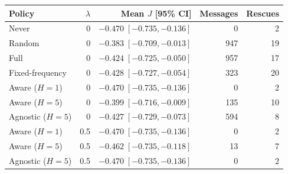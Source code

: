 \begin{tabular}{@{}lrrrr@{}}
\toprule
Policy & $\lambda$ & Mean $J$ [95\% CI] & Messages & Rescues \\
\midrule
Never & 0 & $-0.470\; [-0.735, -0.136]$ & 0 & 2 \\
Random & 0 & $-0.383\; [-0.709, -0.013]$ & 947 & 19 \\
Full & 0 & $-0.424\; [-0.725, -0.050]$ & 957 & 17 \\
Fixed-frequency & 0 & $-0.428\; [-0.727, -0.054]$ & 323 & 20 \\
Aware ($H=1$) & 0 & $-0.470\; [-0.735, -0.136]$ & 0 & 2 \\
Aware ($H=5$) & 0 & $-0.399\; [-0.716, -0.009]$ & 135 & 10 \\
Agnostic ($H=5$) & 0 & $-0.427\; [-0.729, -0.073]$ & 594 & 8 \\
Aware ($H=1$) & 0.5 & $-0.470\; [-0.735, -0.136]$ & 0 & 2 \\
Aware ($H=5$) & 0.5 & $-0.462\; [-0.735, -0.118]$ & 13 & 7 \\
Agnostic ($H=5$) & 0.5 & $-0.470\; [-0.735, -0.136]$ & 0 & 2 \\
\bottomrule
\end{tabular}
